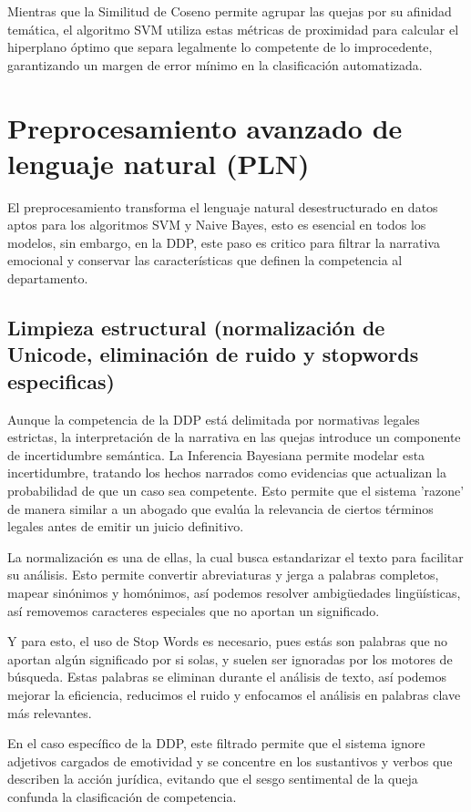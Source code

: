 Mientras que la Similitud de Coseno permite agrupar las quejas por su afinidad temática, el algoritmo SVM utiliza estas métricas de proximidad para calcular el hiperplano óptimo que separa legalmente lo competente de lo improcedente, garantizando un margen de error mínimo en la clasificación automatizada.

\section{Preprocesamiento avanzado de lenguaje natural (PLN)}

El preprocesamiento transforma el lenguaje natural desestructurado en datos aptos para los algoritmos SVM y Naive Bayes, esto es esencial en todos los modelos, sin embargo, en la DDP, este paso es critico para filtrar la narrativa emocional y conservar las características que definen la competencia al departamento.

\subsection{Limpieza estructural (normalización de Unicode, eliminación de ruido y stopwords especificas)}

Aunque la competencia de la DDP está delimitada por normativas legales estrictas, la interpretación de la narrativa en las quejas introduce un componente de incertidumbre semántica. La Inferencia Bayesiana permite modelar esta incertidumbre, tratando los hechos narrados como evidencias que actualizan la probabilidad de que un caso sea competente. Esto permite que el sistema 'razone' de manera similar a un abogado que evalúa la relevancia de ciertos términos legales antes de emitir un juicio definitivo.

La normalización es una de ellas, la cual busca estandarizar el texto para facilitar su análisis. Esto permite convertir abreviaturas y jerga a palabras completos, mapear sinónimos y homónimos, así podemos resolver ambigüedades lingüísticas, así removemos caracteres especiales que no aportan un significado.

Y para esto, el uso de Stop Words es necesario, pues estás son palabras que no aportan algún significado por si solas, y suelen ser ignoradas por los motores de búsqueda. Estas palabras se eliminan durante el análisis de texto, así podemos mejorar la eficiencia, reducimos el ruido y enfocamos el análisis en palabras clave más relevantes.

En el caso específico de la DDP, este filtrado permite que el sistema ignore adjetivos cargados de emotividad y se concentre en los sustantivos y verbos que describen la acción jurídica, evitando que el sesgo sentimental de la queja confunda la clasificación de competencia.

